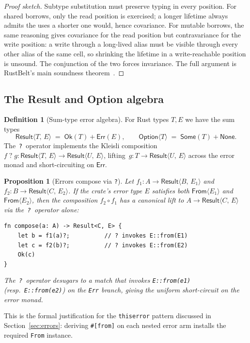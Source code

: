 \documentclass[12pt]{article}
\newtheorem{proposition}[theorem]{Proposition}
\theoremstyle{definition}
\newtheorem{definition}[theorem]{Definition}
\theoremstyle{remark}
\newcommand{\Result}[2]{\ensuremath{\mathsf{Result}\langle #1,\,#2\rangle}}
\newcommand{\Option}[1]{\ensuremath{\mathsf{Option}\langle #1\rangle}}
\begin{document}
\begin{proof}[Proof sketch]
Subtype substitution must preserve typing in every position. For shared
borrows, only the read position is exercised; a longer lifetime always
admits the uses a shorter one would, hence covariance. For mutable borrows,
the same reasoning gives covariance for the read position but
contravariance for the write position: a write through a long-lived
alias must be visible through every other alias of the same cell, so
shrinking the lifetime in a write-reachable position is unsound. The
conjunction of the two forces invariance. The full argument is RustBelt's
main soundness theorem~\cite{rustbelt}.
\end{proof}

\subsection{The Result and Option algebra}

\begin{definition}[Sum-type error algebra]
For Rust types $T, E$ we have the sum types
\[
\Result{T}{E} \;=\; \mathsf{Ok}(T) + \mathsf{Err}(E),
\qquad
\Option{T} \;=\; \mathsf{Some}(T) + \mathsf{None}.
\]
The \,\texttt{?}\, operator implements the Kleisli composition
$f \;\texttt{?}\; g : \Result{T}{E} \to \Result{U}{E}$, lifting
\,$g : T \to \Result{U}{E}$ across the error monad and short-circuiting on
$\mathsf{Err}$.
\end{definition}

\begin{proposition}[Errors compose via \texttt{?}]
\label{thm:errors-compose}
Let $f_1 : A \to \Result{B}{E_1}$ and $f_2 : B \to \Result{C}{E_2}$. If
the crate's error type $E$ satisfies both $\mathsf{From}\langle E_1\rangle$
and $\mathsf{From}\langle E_2\rangle$, then the composition $f_2 \circ f_1$
has a canonical lift to $A \to \Result{C}{E}$ via the \,\texttt{?}\, operator
alone:
\begin{lstlisting}
fn compose(a: A) -> Result<C, E> {
    let b = f1(a)?;          // ? invokes E::from(E1)
    let c = f2(b)?;          // ? invokes E::from(E2)
    Ok(c)
}
\end{lstlisting}
The \,\texttt{?}\, operator desugars to a match that invokes
\texttt{E::from(e1)} (resp.\ \texttt{E::from(e2)}) on the \texttt{Err}
branch, giving the uniform short-circuit on the error monad.
\end{proposition}

This is the formal justification for the \texttt{thiserror} pattern
discussed in Section~\ref{sec:errors}: deriving \texttt{\#[from]} on each
nested error arm installs the required \texttt{From} instance.
\end{document}
